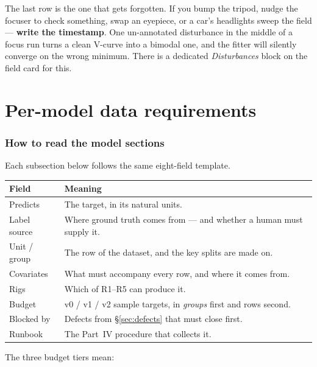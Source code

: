 \documentclass[11pt]{article}
\begin{document}
\begin{keybox}
The last row is the one that gets forgotten. If you bump the tripod, nudge the
focuser to check something, swap an eyepiece, or a car's headlights sweep the
field --- \textbf{write the timestamp}. One un-annotated disturbance in the
middle of a focus run turns a clean V-curve into a bimodal one, and the fitter
will silently converge on the wrong minimum. There is a dedicated
\emph{Disturbances} block on the field card for this.
\end{keybox}

\part{Per-model data requirements}

\section{How to read the model sections}

Each subsection below follows the same eight-field template.

\begin{center}
\small
\begin{tabular}{@{}ll@{}}
\toprule
\textbf{Field} & \textbf{Meaning} \\
\midrule
Predicts & The target, in its natural units. \\
Label source & Where ground truth comes from --- and whether a human must supply it. \\
Unit / group & The row of the dataset, and the key splits are made on. \\
Covariates & What must accompany every row, and where it comes from. \\
Rigs & Which of R1--R5 can produce it. \\
Budget & v0 / v1 / v2 sample targets, in \emph{groups} first and rows second. \\
Blocked by & Defects from \S\ref{sec:defects} that must close first. \\
Runbook & The Part~IV procedure that collects it. \\
\bottomrule
\end{tabular}
\end{center}

The three budget tiers mean:
\end{document}
